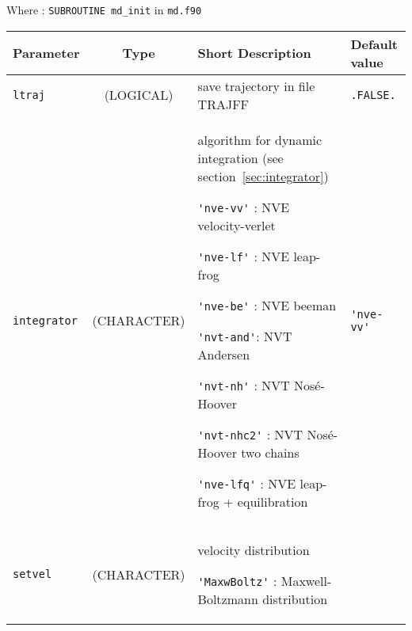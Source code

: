 \documentclass[a4paper]{article}
\begin{document}
Where : \verb?SUBROUTINE md_init? in \verb?md.f90?
\newline

\begin{longtable}{l|c|m{8cm}|m{2cm}}
\hline
\hline
Parameter        &  Type              &          Short Description                                                          & Default value \\
\hline
\hline
\rule[-0.75cm]{0cm}{1.5cm}
\verb?ltraj?         & (LOGICAL)      &  save trajectory in file TRAJFF                                                     & \verb?.FALSE.? \\
\hline
\rule[-0.75cm]{0cm}{1.5cm}
\verb?integrator?    & (CHARACTER)    &  \newline algorithm for dynamic integration (see section~\ref{sec:integrator}) \newline                   

                                         \verb?'nve-vv'? : NVE velocity-verlet \newline
					  
					 \verb?'nve-lf'? : NVE leap-frog \newline
					   
				         \verb?'nve-be'? : NVE beeman \newline
					 
					 \verb?'nvt-and'?: NVT Andersen \newline
					 
					 \verb?'nvt-nh'? : NVT Nosé-Hoover \newline
					 
					 \verb?'nvt-nhc2'? : NVT Nosé-Hoover two chains \newline
					 
					 \verb?'nve-lfq'? : NVE leap-frog +  equilibration \newline                         & \verb?'nve-vv'? \tabularnewline
\hline
\rule[-0.75cm]{0cm}{1.5cm}
\verb?setvel?        & (CHARACTER)    &  \newline velocity distribution \newline 
                                        
					 \verb?'MaxwBoltz'? : Maxwell-Boltzmann distribution \newline 


\end{longtable}
\end{document}
